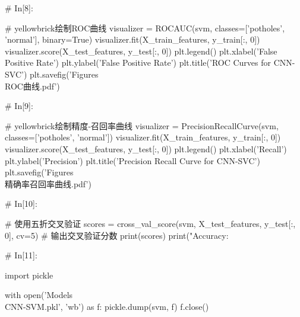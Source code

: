 \documentclass{MathorCupmodeling}
\begin{document}
\begin{python}
# In[8]:


# yellowbrick绘制ROC曲线
visualizer = ROCAUC(svm, classes=['potholes', 'normal'], binary=True)
visualizer.fit(X_train_features, y_train[:, 0])
visualizer.score(X_test_features, y_test[:, 0])
plt.legend()
plt.xlabel('False Positive Rate')
plt.ylabel('False Positive Rate')
plt.title('ROC Curves for CNN-SVC')
plt.savefig('Figures\\[CNN-SVC]ROC曲线.pdf')

# In[9]:


# yellowbrick绘制精度-召回率曲线
visualizer = PrecisionRecallCurve(svm, classes=['potholes', 'normal'])
visualizer.fit(X_train_features, y_train[:, 0])
visualizer.score(X_test_features, y_test[:, 0])
plt.legend()
plt.xlabel('Recall')
plt.ylabel('Precision')
plt.title('Precision Recall Curve for CNN-SVC')
plt.savefig('Figures\\[CNN-SVC]精确率召回率曲线.pdf')

# In[10]:


# 使用五折交叉验证
scores = cross_val_score(svm, X_test_features, y_test[:, 0], cv=5)
# 输出交叉验证分数
print(scores)
print("Accuracy: %

# In[11]:


import pickle

with open('Models\\CNN-SVM.pkl', 'wb') as f:
    pickle.dump(svm, f)
f.close()

\end{python}
\end{document}
